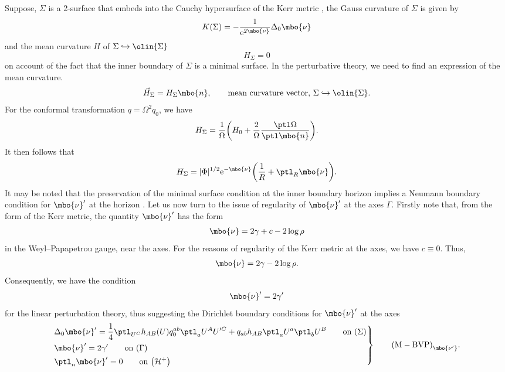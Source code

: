 Suppose, $\Sigma$ is a 2-surface that embeds into the Cauchy hypersurface of the Kerr metric \smash{$(\Sigma \hookrightarrow) \olin{\Sigma}$}, the Gauss curvature of $\Sigma$ is given by
\begin{align*}
K (\Sigma) = - \frac{1}{{\rm e}^{2 \mbo{\nu}}} \Delta_0 \mbo{\nu}
\end{align*}
and the mean curvature $H$ of $\Sigma \hookrightarrow \olin{\Sigma}$
\[
H_\Sigma = 0
\]
on account of the fact that the inner boundary of $\Sigma$ is a minimal surface. In the perturbative theory, we need to find an expression of the mean curvature.
\begin{align*}
\vec{H}_{\Sigma} = H_{\Sigma} \mbo{n}, \qquad \text{mean curvature vector, $\Sigma \hookrightarrow \olin{\Sigma}$}.
\end{align*}
For the conformal transformation $q= \Omega^2 q_0$, we have
\begin{align*}
H_\Sigma = \frac{1}{\Omega} \biggl(H_0 + \frac{2}{\Omega} \frac{ \ptl \Omega}{\ptl \mbo{n}} \biggr).
\end{align*}
It then follows that
\begin{align*}
H_{\Sigma} = \vert \Phi \vert^{1/2} {\rm e}^{-\mbo{\nu}} \biggl(\frac{1}{R} + \ptl_R \mbo{\nu}
\biggr).
\end{align*}
It may be noted that the preservation of the minimal surface condition at the inner boundary horizon  implies a Neumann boundary condition for $\mbo{\nu}'$ at the horizon .
Let us now turn to the issue of regularity of $\mbo{\nu}'$ at the axes $\Gamma$. Firstly note that, from the form of the Kerr metric, the quantity $\mbo{\nu}'$ has the form
\begin{align*}
\mbo{\nu} = 2\gamma + c - 2 \log \rho
\end{align*}
in the Weyl--Papapetrou gauge, near the axes. For the reasons of regularity of the Kerr metric at the axes, we have $c \equiv 0$. Thus,
\begin{align*}
\mbo{\nu} = 2 \gamma - 2 \log \rho.
\end{align*}
Consequently, we have the condition
\begin{align} \label{gamma-nu condition}
\mbo{\nu}' = 2 \gamma'
\end{align}
for the linear perturbation theory, thus suggesting the Dirichlet boundary conditions for $\mbo{\nu}'$ at the axes
\begin{equation*}
\left.\begin{aligned}
&\Delta_0 \mbo{\nu}'=\frac{1}{4} \ptl_{U^C} h_{AB}(U) q^{ab}_{0} \ptl_a U^A U'^C + q_{ab} h_{AB} \ptl_a U^a \ptl_b U^B \qquad \text{on}\ (\Sigma)\\
&\mbo{\nu}' = 2\gamma' \qquad \text{on} \ (\Gamma) \\
&\ptl_n \mbo{\nu}'=0 \qquad \text{on} \ \bigl(\mathcal{H}^{+}\bigr)
\end{aligned}
 \right\}
\qquad {\rm (M-BVP)}_{\mbo{\nu'}}.
\end{equation*}

